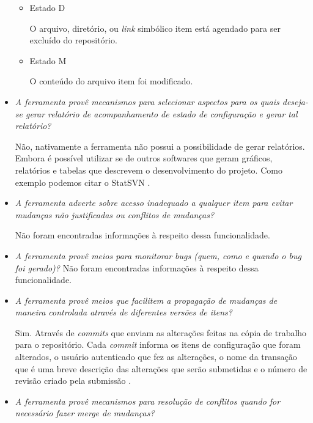 \begin{itemize}
\begin{itemize}
          \item Estado D

          O arquivo, diretório, ou \textit{link} simbólico item está agendado para ser excluído do repositório.

          \item Estado M

          O conteúdo do arquivo item foi modificado.
        \end{itemize}

  \item \textit{A ferramenta provê mecanismos para selecionar aspectos para os quais deseja-se gerar relatório
  de acompanhamento de estado de configuração e gerar tal relatório?}

      Não, nativamente a ferramenta não possui a possibilidade de gerar relatórios. Embora é possível utilizar se de outros softwares que geram gráficos, relatórios e tabelas que descrevem o desenvolvimento do projeto. Como exemplo podemos citar o StatSVN \footnotemark. 

  \item \textit{A ferramenta adverte sobre acesso inadequado a qualquer item para evitar mudanças não justificadas
  ou conflitos de mudanças?}
  
  Não foram encontradas informações à respeito dessa funcionalidade.
  
  \item \textit{A ferramenta provê meios para monitorar bugs (quem, como e quando o bug foi gerado)?}
  Não foram encontradas informações à respeito dessa funcionalidade.
  
  \item \textit{A ferramenta provê meios que facilitem a propagação de mudanças de maneira controlada
  através de diferentes versões de itens?}
  
  Sim. Através de \textit{commits} que enviam as alterações feitas na cópia de trabalho para o repositório. Cada \textit{commit} 
  informa os itens de configuração que foram alterados, o usuário autenticado que fez as alterações, o nome da transação que é uma breve descrição
  das alterações que serão submetidas e o número de revisão criado pela submissão \cite{svn-book}.
  
  \item \textit{A ferramenta provê mecanismos para resolução de conflitos quando for necessário fazer merge
  de mudanças?}
  

\end{itemize}
